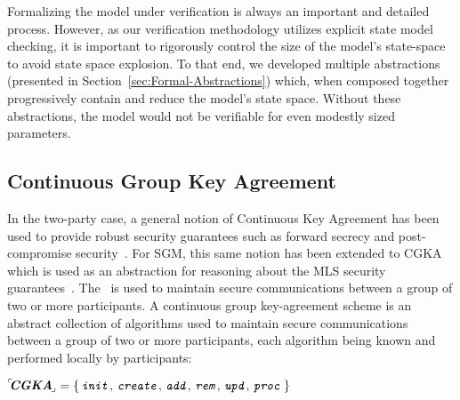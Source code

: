 \documentclass[runningheads]{llncs}
\newcommand{\Abrev}[1]{\gls{#1}}
\begin{document}
Formalizing the model under verification is always an important and detailed process.
However, as our verification methodology utilizes explicit state model checking, it is important to rigorously control the size of the model's state-space to avoid state space explosion. 
To that end, we developed multiple abstractions (presented in Section~\ref{sec:Formal-Abstractions}) which, when composed together progressively contain and reduce the model's state space. 
Without these abstractions, the model would not be verifiable for even modestly sized parameters.

\subsection{Continuous Group Key Agreement}

In the two-party case, a general notion of Continuous Key Agreement has been used to provide robust security guarantees such as forward secrecy and post-compromise security~\cite{alwen2019double}.
For \Abrev{SGM}, this same notion has been extended to \Abrev{CGKA} which is used as an abstraction for reasoning about the \Abrev{MLS} security guarantees~\cite{alwen2020security}.
The  \CGKAdef\ is used to maintain secure communications between a group of two or more participants.
A continuous group key-agreement scheme is an abstract collection of algorithms used to maintain secure communications between a group of two or more participants, each algorithm being known and performed locally by participants:\\[2mm]
\centerline{${}^{\ulcorner}\!\!\textbf{\textit{CGKA}}_{\!\lrcorner} = \left\{\,\texttt{\textit{init}},\, \texttt{\textit{create}},\, \texttt{\textit{add}},\, \texttt{\textit{rem}},\, \texttt{\textit{upd}},\, \texttt{\textit{proc}}\,\right\}$}\\[-3mm]
\end{document}
